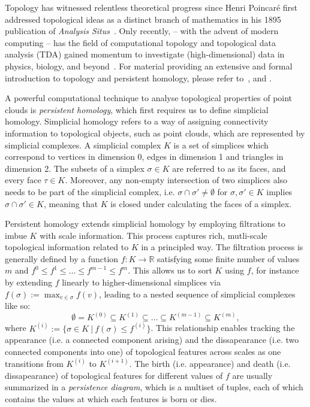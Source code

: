 Topology has witnessed relentless theoretical progress since Henri Poincaré
first addressed topological ideas as a distinct branch of mathematics in his
1895 publication of \textit{Analysis Situs}~\citep{poincare1895analysis}. Only
recently, -- with the advent of modern computing -- has the field of
computational topology and topological data analysis (TDA) gained momentum to
investigate (high-dimensional) data in physics, biology, and
beyond~\citep{dey1999computational, ghrist2008barcodes, amezquita2020shape}. For
material providing an extensive and formal introduction to topology and
persistent homology, please refer to~\citep{freedman2009algebraic,
edelsbrunner2010computational}, and \citep{ghrist2008barcodes}.

A powerful computational technique to analyse topological properties of point
clouds is \emph{persistent homology}, which first requires us to define
simplicial homology. Simplicial homology refers to a way of assigning
connectivity information to topological objects, such as point clouds, which are
represented by simplicial complexes. A simplicial complex $K$ is a set of
simplices which correspond to vertices in dimension 0, edges in dimension 1 and
triangles in dimension 2. The subsets of a simplex $\sigma\in K$ are referred to
as its faces, and every face $\tau\in K$. Moreover, any non-empty intersection
of two simplices also needs to be part of the simplicial complex, i.e.
$\sigma\cap\sigma '\neq\emptyset$ for $\sigma,\sigma '\in K$ implies
$\sigma\cap\sigma'\in K$, meaning that $K$ is closed under calculating the faces
of a simplex.

Persistent homology extends simplicial homology by employing filtrations to
imbue $K$ with scale information. This process captures rich, mutli-scale
topological information related to $K$ in a principled way. The filtration
process is generally defined by a function $f: K\to\mathbb{R}$ satisfying some
finite number of values $m$ and $f^{0}\leq f^{1}\leq\dots\leq f^{m-1}\leq
f^{m}$. This allows us to sort $K$ using $f$, for instance by extending $f$
linearly to higher-dimensional simplices via $f(\sigma):=\max_{v\in\sigma}f(v)$,
leading to a nested sequence of simplicial complexes like so:
\begin{equation}
  \label{eq:nested_simplicial_complexes}
  \emptyset=K^{(0)}\subseteq K^{(1)}\subseteq \dots\subseteq K^{(m-1)}\subseteq K^{(m)},
\end{equation}
where $K^{(i)}:=\{\sigma\in K\ |\ f(\sigma)\leq f^{(i)}\}$. This relationship
enables tracking the appearance (i.e. a connected component arising) and the
dissapearance (i.e. two connected components into one) of topological features
across scales as one transitions from $K^{(i)}$ to $K^{(i+1)}$. The birth (i.e.
appearance) and death (i.e. dissapearance) of topological features for different
values of $f$ are usually summarized in a \emph{persistence diagram}, which is a
multiset of tuples, each of which contains the values at which each features is
born or dies.

